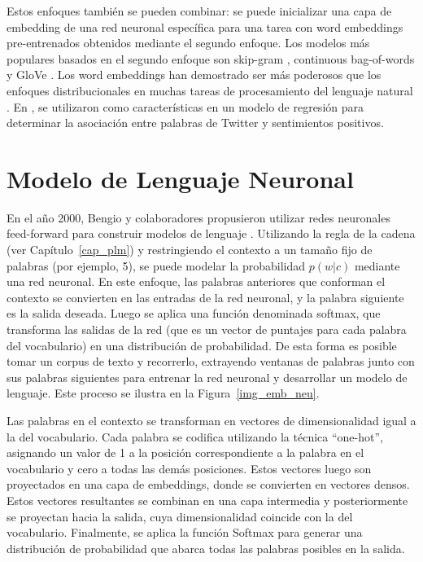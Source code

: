 Estos enfoques también se pueden combinar: se puede inicializar una capa de embedding de una red neuronal específica para una tarea con word embeddings pre-entrenados obtenidos mediante el segundo enfoque.
Los modelos más populares basados en el segundo enfoque son skip-gram \cite{Mikolov2013}, continuous bag-of-words \cite{Mikolov2013} y GloVe \cite{penningtonSM14}.
Los word embeddings han demostrado ser más poderosos que los enfoques distribucionales en muchas tareas de procesamiento del lenguaje natural \cite{baroni2014don}.
En \cite{amir2015SemEval}, se utilizaron como características en un modelo de regresión para determinar la asociación entre palabras de Twitter y sentimientos positivos.

\section{Modelo de Lenguaje Neuronal}
En el año 2000, Bengio y colaboradores propusieron utilizar redes neuronales feed-forward para construir modelos de lenguaje \cite{bengio2000neural}. Utilizando la regla de la cadena (ver Capítulo~\ref{cap_plm}) y restringiendo el contexto a un tamaño fijo de palabras (por ejemplo, 5), se puede modelar la probabilidad $p(w|c)$ mediante una red neuronal. En este enfoque, las palabras anteriores que conforman el contexto se convierten en las entradas de la red neuronal, y la palabra siguiente es la salida deseada. Luego se aplica una función denominada softmax, que transforma las salidas de la red (que es un vector de puntajes para cada palabra del vocabulario) en una distribución de probabilidad. De esta forma es posible tomar un corpus de texto y recorrerlo, extrayendo ventanas de palabras junto con sus palabras siguientes para entrenar la red neuronal y desarrollar un modelo de lenguaje. Este proceso se ilustra en la Figura~\ref{img_emb_neu}.


Las palabras en el contexto se transforman en vectores de dimensionalidad igual a la del vocabulario. Cada palabra se codifica utilizando la técnica ``one-hot'', asignando un valor de 1 a la posición correspondiente a la palabra en el vocabulario y cero a todas las demás posiciones. Estos vectores luego son proyectados en una capa de embeddings, donde se convierten en vectores densos. Estos vectores resultantes se combinan en una capa intermedia y posteriormente se proyectan hacia la salida, cuya dimensionalidad coincide con la del vocabulario. Finalmente, se aplica la función Softmax para generar una distribución de probabilidad que abarca todas las palabras posibles en la salida.

